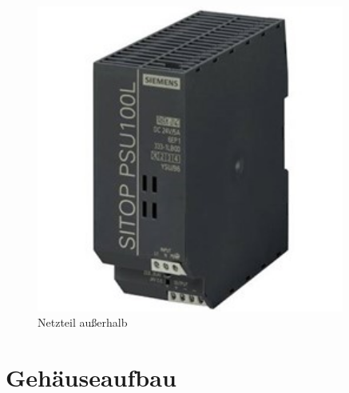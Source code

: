 \documentclass[10pt,a4paper]{report}
\begin{document}
\begin{figure}
\begin{minipage}[b]{.4\linewidth}
			\includegraphics[width=0.9\textwidth]{Netzteil 2}
			\centering
			\caption{Netzteil außerhalb}
		\end{minipage}
	\end{figure}	
	
	\chapter{Gehäuseaufbau}
	
\end{document}
